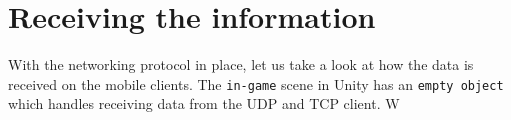 \section{Receiving the information}
With the networking protocol in place, let us take a look at how the data is received on the mobile clients.
The \texttt{in-game} scene in Unity has an \texttt{empty object} which handles receiving data from the UDP and TCP client.
W